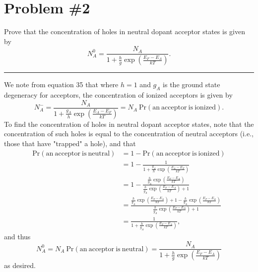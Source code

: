 \documentclass{article}
\newcommand{\horline}
           {\begin{center}
              \noindent\rule{8cm}{0.4pt}
            \end{center}}
\begin{document}
\section*{Problem \#2}
Prove that the concentration of holes in neutral dopant acceptor
states is given by
$$
N_{A}^{0} = \frac{N_A}
                 {1 + \frac{h}{g} 
                      \exp\left(\frac{E_F - E_A}{kT}\right)}.
$$
\horline
We note from equation 35 that where $h=1$ and $g_A$ is the ground state 
degeneracy for acceptors, the concentration of ionized acceptors is given by
$$
N_{A}^{-} = \frac{N_A}{1 + \frac{g_{A}}{h}\exp\left(\frac{E_A - E_F}{kT}\right)}
          =  N_A ~\mathrm{Pr(an~acceptor~is~ionized)}.
$$
To find the concentration of holes in neutral dopant acceptor states, note 
that the concentration of such holes is equal to the concentration of neutral
acceptors (i.e., those that have "trapped" a hole), and that
\begin{align*}
\mathrm{Pr(an~acceptor~is~neutral)} &= 1 - \mathrm{Pr(an~acceptor~is~ionized)} \\
  &= 1 - \frac{1}{1 + \frac{g_A}{h} \exp\left(\frac{E_A - E_F}{kT}\right)} \\
  &= 1 - \frac{\frac{h}{g_A} \exp \left(\frac{E_F - E_A}{kT}\right)}
              {\frac{h}{g_A} \exp \left(\frac{E_F - E_A}{kT}\right) + 1} \\
  &= \frac{\frac{h}{g_A} \exp \left(\frac{E_F - E_A}{kT}\right) + 1 
         - \frac{h}{g_A} \exp \left(\frac{E_F - E_A}{kT}\right)}
          { \frac{h}{g_A} \exp \left(\frac{E_F - E_A}{kT}\right) + 1} \\
  &= \frac{1}{1 + \frac{h}{g_A} \exp\left(\frac{E_F - E_A}{kT}\right)},
\end{align*}
and thus
$$
N_A^0 = N_A ~\mathrm{Pr(an~acceptor~is~neutral)}
      = \frac{N_A}{1 + \frac{h}{g} \exp\left(\frac{E_F - E_A}{kT}\right)}
$$
as desired.
\end{document}

